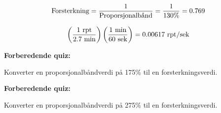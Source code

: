 
$$\hbox{Forsterkning} = {1 \over \hbox{Proporsjonalbånd}} = {1 \over 130\%} = 0.769$$

\vskip 10pt

$$\left(1 \hbox{ rpt} \over 2.7 \hbox{ min}\right) \left(1 \hbox{ min} \over 60 \hbox{ sek}\right) = 0.00617 \hbox{ rpt/sek}$$






\vfil \eject

\noindent
{\bf Forberedende quiz:}

Konverter en proporsjonalbåndverdi på 175\% til en forsterkningsverdi.






\vfil \eject

\noindent
{\bf Forberedende quiz:}

Konverter en proporsjonalbåndverdi på 275\% til en forsterkningsverdi.




